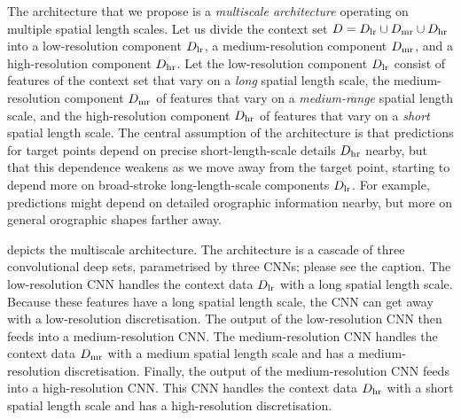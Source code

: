 \documentclass[12pt, twoside]{report}
\begin{document}
The architecture that we propose is a \emph{multiscale architecture} operating on multiple spatial length scales.
Let us divide the context set $D = D\ss{lr} \cup D\ss{mr} \cup D\ss{hr}$ into
a low-resolution component $D\ss{lr}$, a medium-resolution component $D\ss{mr}$, and a high-resolution component $D\ss{hr}$.
Let the low-resolution component $D\ss{lr}$ consist of features of the context set that vary on a \emph{long} spatial length scale,
the medium-resolution component $D\ss{mr}$ of features that vary on a \emph{medium-range} spatial length scale,
and the high-resolution component $D\ss{hr}$ of features that vary on a \emph{short} spatial length scale. 
The central assumption of the architecture is that predictions for target points depend on precise short-length-scale details $D\ss{hr}$ nearby, but that this dependence weakens as we move away from the target point, starting to depend more on broad-stroke long-length-scale components $D\ss{lr}$.
For example, 
predictions might depend on detailed orographic information nearby,
but more on general orographic shapes farther away.

 depicts the multiscale architecture.
The architecture is a cascade of three convolutional deep sets, parametrised by three CNNs;
please see the caption.
The low-resolution CNN handles the context data $D\ss{lr}$ with a long spatial length scale.
Because these features have a long spatial length scale, the CNN can get away with a low-resolution discretisation.
The output of the low-resolution CNN then feeds into a medium-resolution CNN.
The medium-resolution CNN handles the context data $D\ss{mr}$ with a medium spatial length scale and has a medium-resolution discretisation.
Finally, the output of the medium-resolution CNN feeds into a high-resolution CNN.
This CNN handles the context data $D\ss{hr}$ with a short spatial length scale and has a high-resolution discretisation.
\end{document}

